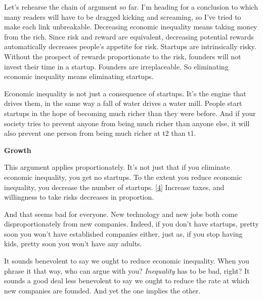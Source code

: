 Let's rehearse the chain of argument
                  so far. I'm heading for a conclusion to which many readers
                  will have to be dragged kicking and screaming, so I've tried
                  to make each link unbreakable. Decreasing economic inequality
                  means taking money from the rich. Since risk and reward are
                  equivalent, decreasing potential rewards automatically
                  decreases people's appetite for risk. Startups are
                  intrinsically risky. Without the prospect of rewards
                  proportionate to the risk, founders will not invest their time
                  in a startup. Founders are irreplaceable. So eliminating
                  economic inequality means eliminating startups.

Economic
                  inequality is not just a consequence of startups. It's the
                  engine that drives them, in the same way a fall of water
                  drives a water mill. People start startups in the hope of
                  becoming much richer than they were before. And if your
                  society tries to prevent anyone from being much richer than
                  anyone else, it will also prevent one person from being much
                  richer at t2 than t1.

\textbf{Growth}

This
                  argument applies proportionately. It's not just that if you
                  eliminate economic inequality, you get no startups. To the
                  extent you reduce economic inequality, you decrease the number
                  of startups.
                  [\href{\#f4n}{4}]
                  Increase taxes, and willingness to take risks decreases in
                  proportion.

And that seems bad for everyone. New
                  technology and new jobs both come disproportionately from new
                  companies. Indeed, if you don't have startups, pretty soon you
                  won't have established companies either, just as, if you stop
                  having kids, pretty soon you won't have any adults.

It
                  sounds benevolent to say we ought to reduce economic
                  inequality. When you phrase it that way, who can argue with
                  you? \emph{Inequality} has to be bad, right? It sounds a good
                  deal less benevolent to say we ought to reduce the rate at
                  which new companies are founded. And yet the one implies the
                  other.

